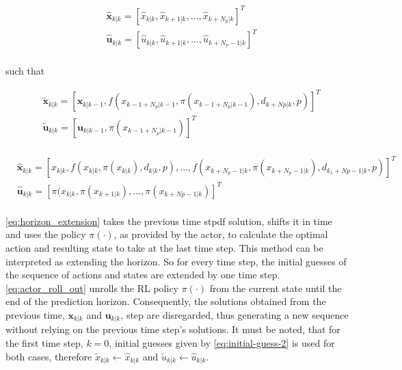 \begin{equation}\label{eq:initial-guess-2}
	\begin{aligned}
		&\hat{\mathbf{x}}_{k|k} = [\hat{x}_{k|k},\hat{x}_{k+1|k},...,\hat{x}_{k + N_p|k}]^T \\ 
		&\hat{\mathbf{u}}_{k|k} = [\hat{u}_{k|k},\hat{u}_{k + 1|k},...,\hat{u}_{k + N_p - 1|k}]^T\\ 
	\end{aligned}
\end{equation}

such that

 \begin{equation}\label{eq:horizon_extension}
 	\begin{aligned}
 		&\tilde{\mathbf{x}}_{k|k} = [\mathbf{x}_{k|k-1},f(x_{k-1 + N_p|k-1}, \pi(x_{k-1 + N_p|k-1}), d_{k+Np|k},p)]^T\\ 
 		&\tilde{\mathbf{u}}_{k|k} = [\mathbf{u}_{k|k-1},\pi(x_{k-1 + N_p|k-1})]^T\\
 	\end{aligned}
 \end{equation}

\begin{equation}\label{eq:actor_roll_out}
	\begin{aligned}
		&\hat{\mathbf{x}}_{k|k} = [x_{k|k},f(x_{k|k},\pi(x_{k|k}),d_{k|k},p),..., f(x_{k+N_p-1|k}, \pi(x_{k + N_p-1|k}), d_{k_1 + Np-1|k},p)]^T \\ 
		&\hat{\mathbf{u}}_{k|k} = [\pi(x_{k|k},\pi(x_{k+1|k}),...,\pi(x_{k+Np-1|k})]^T \\ 
	\end{aligned}
	\end{equation}

\autoref{eq:horizon_extension} takes the previous time stpdf solution, shifts it in time and uses the policy $\pi(\cdot)$, as provided by the actor, to calculate the optimal action and resulting state to take at the last time step. This method can be interpreted as extending the horizon. So for every time step, the initial guesses of the sequence of actions and states are extended by one time step. \autoref{eq:actor_roll_out} unrolls the RL policy $\pi(\cdot)$ from the current state until the end of the prediction horizon. Consequently, the  solutions obtained from the previous time, $\mathbf{x}_{k|k}$ and $\mathbf{u}_{k|k}$, step are disregarded, thus generating a new sequence without relying on the previous time step's solutions. It must be noted, that for the first time step, $k=0$, initial guesses given by \autoref{eq:initial-guess-2} is used for both cases, therefore $\tilde{x}_{k|k} \leftarrow \hat{x}_{k|k}$ and $\tilde{u}_{k|k} \leftarrow \hat{u}_{k|k}$.


